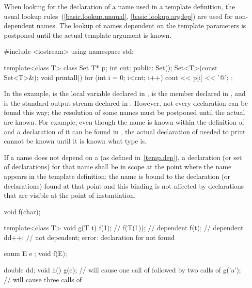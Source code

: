 \pnum
When looking for the declaration of a name used in a template definition,
the usual lookup rules~(\ref{basic.lookup.unqual}, \ref{basic.lookup.argdep})
are used for non-dependent names.
The lookup of names dependent on the template parameters
is postponed until the actual template argument is known.
\begin{example}
\begin{codeblock}
#include <iostream>
using namespace std;

template<class T> class Set {
  T* p;
  int cnt;
public:
  Set();
  Set<T>(const Set<T>&);
  void printall() {
    for (int i = 0; i<cnt; i++)
      cout << p[i] << '@\textbackslash@n';
  }
};
\end{codeblock}

In the example,
is the local variable
declared in
,
is the member
declared in
,
and
is the standard output stream declared in
.
However, not every declaration can be found this way; the resolution of
some names must be postponed
until the actual
are known.
For example, even though the name
is known within the definition of
and a declaration of it can be found in
,
the actual declaration of
needed to print
cannot be known until it is known what type
is.
\end{example}

\pnum
If a name does not depend on a
(as defined in~\ref{temp.dep}), a declaration (or set of declarations) for that
name shall be in scope at the point where the name appears in the template
definition; the name is bound to the declaration (or declarations) found
at that point and this binding is not affected by declarations that are
visible at the point of instantiation.
\begin{example}
\begin{codeblock}
void f(char);

template<class T> void g(T t) {
  f(1);             // 
  f(T(1));          // dependent
  f(t);             // dependent
  dd++;             // not dependent; error: declaration for  not found
}

enum E { e };
void f(E);

double dd;
void h() {
  g(e);             // will cause one call of  followed by two calls of 
  g('a');           // will cause three calls of 
}
\end{codeblock}
\end{example}

